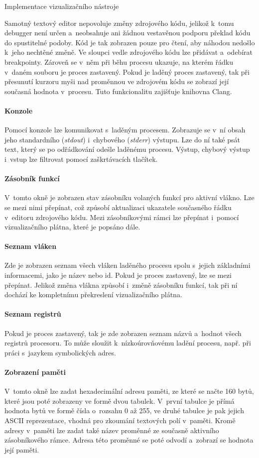 \documentclass[czech,bachelor,male,python,dept460,hidelinks]{diploma}						%
\newcommand{\parspace}[1][]{
	\ifthenelse{\isempty{#1}}{\vspace{0mm}}{\vspace{#1}}
	\par
}
\begin{document}
\begin{section}{Implementace vizualizačního nástroje}
		\parspace Samotný textový editor nepovoluje změny zdrojového kódu, jelikož k~tomu debugger není určen a~neobsahuje ani žádnou vestavěnou podporu překlad
		kódu do spustitelné podoby. Kód je tak zobrazen pouze pro čtení, aby náhodou nedošlo k~jeho nechtěné změně. Ve sloupci vedle zdrojového kódu lze přidávat
		a~odebírat breakpointy. Zároveň se v~něm při běhu procesu ukazuje, na kterém řádku v~daném souboru je proces zastavený. Pokud je laděný proces zastavený,
		tak při přesunutí kurzoru myši nad proměnnou ve zdrojovém kódu se zobrazí její současná hodnota v~procesu. Tuto funkcionalitu zajišťuje knihovna Clang.
	\paragraph*{Konzole} Pomocí konzole lze komunikovat s~laděným procesem. Zobrazuje se v~ní obsah jeho standardního (\textit{stdout}) i~chybového (\textit{stderr})
		výstupu. Lze do ní také psát text, který se po odřádkování odešle laděnému procesu. Výstup, chybový výstup i~vstup lze filtrovat pomocí
		zaškrtávacích tlačítek.
	\paragraph*{Zásobník funkcí} V~tomto okně je zobrazen stav zásobníku volaných funkcí pro aktivní vlákno. Lze se mezi nimi přepínat, což způsobí aktualizaci
		ukazatele současného řádku v~editoru zdrojového kódu. Mezi zásobníkovými rámci lze přepínat i~pomocí vizualizačního plátna, které je popsáno dále.
	\paragraph*{Seznam vláken} Zde je zobrazen seznam všech vláken laděného procesu spolu s~jejich základními informacemi, jako je název nebo id. Pokud je proces
		zastavený, lze se mezi přepínat. Jelikož změna vlákna způsobí i~změně zásobníku funkcí, tak při ní dochází ke kompletnímu překreslení vizualizačního
		plátna.
	\paragraph*{Seznam registrů}
		Pokud je proces zastavený, tak je zde zobrazen seznam názvů a~hodnot všech registrů procesoru. To může sloužit k~nízkoúrovňovému ladění procesu, např.
		při práci s~jazykem symbolických adres.
	\paragraph*{Zobrazení paměti} V~tomto okně lze zadat hexadecimální adresu paměti, ze které se načte 160 bytů, které jsou poté zobrazeny ve formě dvou tabulek.
		V~první tabulce je přímá hodnota bytů ve formě čísla o~rozsahu 0 až 255, ve druhé tabulce je pak jejich ASCII reprezentace, vhodná pro zkoumání textových
		polí v~paměti. Kromě adresy v~paměti lze zadat také název proměnné ze současně aktivního zásobníkového rámce. Adresa této proměnné se poté odvodí
		a~zobrazí se hodnota její paměti.

\end{section}
\end{document}
